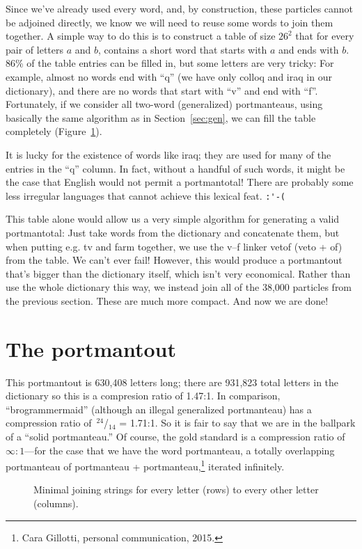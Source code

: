 \documentclass{article}
\newcommand\sfrac[2]{{}\,$^{#1}$\!/{}\!$_{#2}$}
\begin{document}
Since we've already used every word, and, by construction, these
particles cannot be adjoined directly, we know we will need to reuse
some words to join them together. A simple way to do this is to
construct a table of size $26^2$ that for every pair of letters $a$
and $b$, contains a short word that starts with $a$ and ends with $b$.
86\% of the table entries can be filled in, but some letters are very
tricky: For example, almost no words end with ``q'' (we have only {\sf
  colloq} and {\sf iraq} in our dictionary), and there are no words
that start with ``v'' and end with ``f''. Fortunately, if we consider
all two-word (generalized) portmanteaus, using basically the same
algorithm as in Section~\ref{sec:gen}, we can fill the table
completely (Figure~\ref{fig:table}).

It is lucky for the existence of words like {\sf iraq}; they are used
for many of the entries in the ``q'' column. In fact, without a
handful of such words, it might be the case that English would not
permit a portmantotal! There are probably some less irregular
languages that cannot achieve this lexical feat. \verb+:'-(+

This table alone would allow us a very simple algorithm for generating
a valid portmantotal: Just take words from the dictionary and
concatenate them, but when putting e.g. {\sf tv} and {\sf farm}
together, we use the v--f linker {\sf vetof} ({\sf veto} + {\sf of})
from the table. We can't ever fail! However, this would produce a
portmantout that's bigger than the dictionary itself, which isn't very
economical. Rather than use the whole dictionary this way, we instead
join all of the 38,000 particles from the previous section. These are
much more compact. And now we are done!

\section{The portmantout}

This portmantout is
630,408
letters long; there are 931,823 total letters in the dictionary so this
is a compresion ratio of 
1.47:1.
In comparison, ``brogrammermaid'' (although an illegal generalized
portmanteau) has a compression ratio of \sfrac{24}{14} = 1.71:1. So it
is fair to say that we are in the ballpark of a ``solid portmanteau.''
Of course, the gold standard is a compression ratio of $\infty : 1$---for
the case that we have the word {\sf portmanteau}, a totally overlapping portmanteau of
{\sf portmanteau} + {\sf portmanteau},\!\footnote{Cara Gillotti, personal communication, 2015.} iterated infinitely.

\begin{figure}[htp]

\caption{Minimal joining strings for every letter (rows) to every other letter (columns).} \label{fig:table}
\end{figure}

%  
\end{document}
